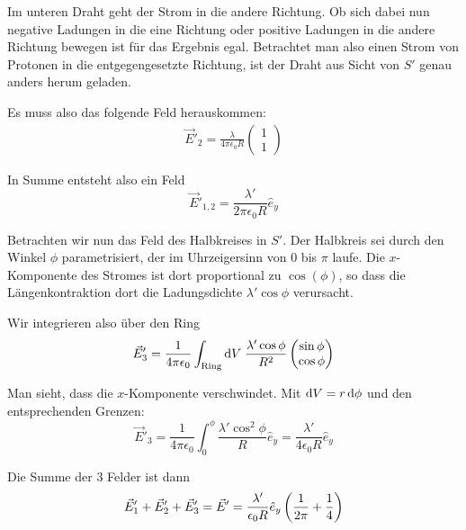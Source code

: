 \documentclass[a4paper,german,12pt,smallheadings]{scrartcl}
\begin{document}
Im unteren Draht geht der Strom in die andere Richtung. Ob sich dabei nun
negative Ladungen in die eine Richtung oder positive Ladungen in die andere
Richtung bewegen ist für das Ergebnis egal. Betrachtet man also einen Strom von
Protonen in die entgegengesetzte Richtung, ist der Draht aus Sicht von $S'$
genau anders herum geladen.

Es muss also das folgende Feld herauskommen:
\begin{align*}
  \vec{E}'_2 = \frac{\lambda}{4 \pi \epsilon_0 R} \begin{pmatrix} 1 \\ 1 \end{pmatrix}
\end{align*}

In Summe entsteht also ein Feld
\begin{equation}
  \vec{E}'_{1,2} = \frac{\lambda'}{2 \pi \epsilon_0 R} \hat{e}_y
\end{equation}

Betrachten wir nun das Feld des Halbkreises in $S'$. Der Halbkreis sei durch
den Winkel $\phi$ parametrisiert, der im Uhrzeigersinn von $0$ bis $\pi$ laufe.
Die $x$-Komponente des Stromes ist dort proportional zu $\cos(\phi)$, so dass
die Längenkontraktion dort die Ladungsdichte $\lambda' \cos \phi$ verursacht.

Wir integrieren also über den Ring
\begin{equation}
  \vec{E}'_3 = \frac{1}{4 \pi \epsilon_0} \int_\text{Ring} \dif V \;
  \frac{\lambda' \cos \phi}{R^2} \begin{pmatrix} \sin \phi \\ \cos \phi \end{pmatrix}
\end{equation}

Man sieht, dass die $x$-Komponente verschwindet. Mit $\dif V = r \dif \phi$ und
den entsprechenden Grenzen:
\begin{equation}
  \vec{E}'_3 = \frac{1}{4 \pi \epsilon_0} \int_0^\phi \frac{\lambda' \cos^2 \phi}{R} \hat{e}_y
  = \frac{\lambda'}{4 \epsilon_0 R} \hat{e}_y
\end{equation}

Die Summe der 3 Felder ist dann
\begin{align*}
  \vec{E}'_1 + \vec{E}'_2 + \vec{E}'_3 = \vec{E}' = \frac{\lambda'}{\epsilon_0 R} \hat{e}_y \del{\frac{1}{2 \pi} + \frac{1}{4}}
\end{align*}
\end{document}
